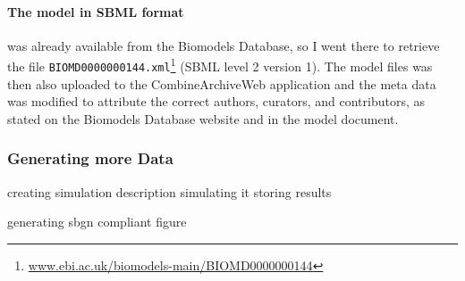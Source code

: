 \paragraph{The model in SBML format} was already available from the Biomodels Database, so I went there to retrieve the file \texttt{BIOMD0000000144.xml}\footnote{\href{http://www.ebi.ac.uk/biomodels-main/BIOMD0000000144}{www.ebi.ac.uk/biomodels-main/BIOMD0000000144}} (SBML level 2 version 1).
The model files was then also uploaded to the CombineArchiveWeb application and the meta data was modified to attribute the correct authors, curators, and contributors, as stated on the Biomodels Database website and in the model document.


\subsubsection{Generating more Data}
creating simulation description
simulating it
storing results

generating sbgn compliant figure



